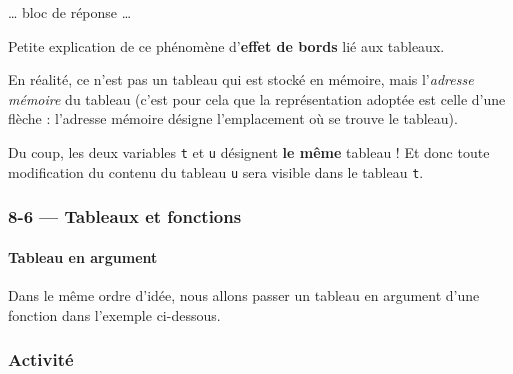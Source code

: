 \documentclass[a4paper,17pt]{extarticle}
\begin{document}
    \ldots{} bloc de réponse \ldots{}

    Petite explication de ce phénomène d'\textbf{effet de bords} lié aux
tableaux.

En réalité, ce n'est pas un tableau qui est stocké en mémoire, mais
l'\emph{adresse mémoire} du tableau (c'est pour cela que la
représentation adoptée est celle d'une flèche : l'adresse mémoire
désigne l'emplacement où se trouve le tableau).

Du coup, les deux variables \texttt{t} et \texttt{u} désignent
\textbf{le même} tableau ! Et donc toute modification du contenu du
tableau \texttt{u} sera visible dans le tableau \texttt{t}.

    \hypertarget{tableaux-et-fonctions}{%
\subsubsection{8-6 --- Tableaux et
fonctions}\label{tableaux-et-fonctions}}

    \hypertarget{tableau-en-argument}{%
\paragraph{Tableau en argument}\label{tableau-en-argument}}

    Dans le même ordre d'idée, nous allons passer un tableau en argument
d'une fonction dans l'exemple ci-dessous.

    \hypertarget{activituxe9}{%
\subsubsection{Activité}\label{activituxe9}}
\end{document}
